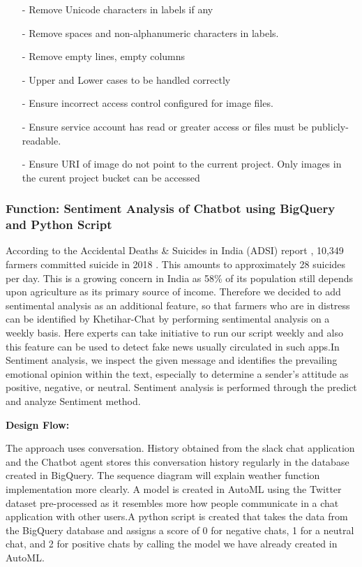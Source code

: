 \documentclass[10pt,conference]{IEEEtran}
\begin{document}
\begin{itemize}
	\item[-] Remove Unicode characters in labels if any
	\item[-] Remove spaces and non-alphanumeric characters in labels.
	\item[-] Remove empty lines, empty columns 
	\item[-] Upper and Lower cases to be handled correctly
	\item[-] Ensure incorrect access control configured for image files. 
	\item[-] Ensure service account has read or greater access or files must be publicly-readable.
	\item[-] Ensure URI of image do not point to the current project. Only images in the curent project bucket can be accessed
\newline
\newline

\end{itemize}


	\subsubsection{ Function:  Sentiment Analysis of Chatbot using BigQuery and Python Script }




{\raggedright
According to the Accidental Deaths \& Suicides in India (ADSI) report \cite{sheth2019cognitive}, 10,349 farmers committed suicide in 2018 \cite{nagarajah2019review}. This amounts to approximately 28 suicides per day. This is a growing concern in India as 58\% of its population still depends upon agriculture as its primary source of income. Therefore we decided to add sentimental analysis as an additional feature, so that farmers who are in distress can be identified by Khetihar-Chat by performing sentimental analysis on a weekly basis. Here experts can take initiative to run our script weekly and also this feature can be used to detect fake news usually circulated in such apps.In Sentiment analysis, we inspect the given message and identifies the prevailing emotional opinion within the text, especially to determine a sender’s attitude as positive, negative, or neutral. Sentiment analysis is performed through the predict and analyze Sentiment method. 
}

{\raggedright
\textbf{Design Flow:}
}

{\raggedright
The approach uses conversation. History obtained from the slack chat application and the Chatbot agent stores this conversation history regularly in the database created in BigQuery. The sequence diagram \cite{thorat2020review} will explain weather function implementation more clearly. A model is created in AutoML using the Twitter dataset pre-processed as it resembles more how people communicate in a chat application with other users.A python script is created that takes the data from the BigQuery database and assigns a score of 0 for negative chats, 1 for a neutral chat, and 2 for positive chats by calling the model we have already created in AutoML.
}
\end{document}
